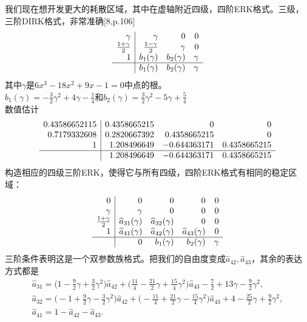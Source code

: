 \documentclass[12pt,a4paper]{article}
\numberwithin{equation}{section}
\begin{document}
我们现在想开发更大的耗散区域，其中在虚轴附近四级，四阶ERK格式。三级，三阶DIRK格式，非常准确[8,p.106]
\[
\begin{array}{r|rrr}
\gamma & \gamma & 0 & 0\\
\frac{1+\gamma }{2} & \frac{1-\gamma }{2} & \gamma  & 0 \\
1 & b_{1}(\gamma ) &  b_{2}(\gamma ) & \gamma \\
\hline
&  b_{1}(\gamma ) &  b_{2}(\gamma ) &\gamma
\end{array}
\]
其中$\gamma$是$6x^3-18x^2+9x-1=0$中点的根。\\
$b_{1}(\gamma)=-\frac{3}{2}\gamma^2+4\gamma-\frac{1}{4}$和$b_{2}(\gamma)=\frac{3}{2}\gamma^2-5\gamma+\frac{5}{4}$\\
数值估计
\[
\begin{array}{r|rrr}
0.43586652115 & 0.4358665215 & 0 & 0\\
0.7179332608 &0.2820667392 & 0.4358665215 & 0\\
1 & 1.208496649 & -0.644363171 & 0.4358665215 \\
\hline
& 1.208496649 & -0.644363171 & 0.4358665215
\end{array}
\]
构造相应的四级三阶ERK，使得它与所有四级，四阶ERK格式有相同的稳定区域：
\[
\begin{array}{r|rrrr}
0 & 0 & 0 & 0 & 0 \\
\gamma & \gamma & 0 & 0 & 0\\
\frac{1+\gamma}{2} & \widehat{a}_{31}(\gamma) & \widehat{a}_{32}(\gamma) & 0 & 0\\
1 & \widehat{a}_{41}(\gamma) & \widehat{a}_{42}(\gamma) & \widehat{a}_{43}(\gamma) & 0\\
\hline
& 0 & b_{1}(\gamma) & b_{2}(\gamma) & \gamma 
\end{array}
\]
三阶条件表明这是一个双参数族格式。把我们的自由度变成$\widehat{a}_{42},\widehat{a}_{43}$，其余的表达方式都是
\begin{gather}
\widehat{a}_{31}=\bigg(1-\frac{9}{2}\gamma+\frac{3}{2}\gamma^2\biggl)\widehat{a}_{42}+\bigg(\frac{11}{4}-\frac{21}{2}\gamma+\frac{15}{4}\gamma^2\biggl)\widehat{a}_{43}-\frac{7}{2}+13\gamma-\frac{9}{2}\gamma^2,\\
\widehat{a}_{32}=\bigg (-1+\frac{9}{2}\gamma-\frac{3}{2}\gamma^2\biggl)\widehat{a}_{42}+\bigg(-\frac{11}{4}+\frac{21}{2}\gamma-\frac{15}{4}\gamma^2\biggl)\widehat{a}_{43}+4-\frac{25}{2}\gamma+\frac{9}{2}\gamma^2,\\
\widehat{a}_{41}=1-\widehat{a}_{42}-\widehat{a}_{43}.
\end{gather}
\end{document}
